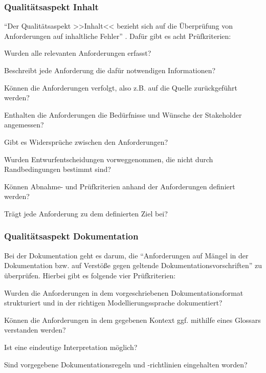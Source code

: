 \documentclass [12pt, a4paper, oneside, titlepage, ngerman]{article}
\begin{document}
\subsubsection{Qualitätsaspekt Inhalt}
"`Der Qualitätsaspekt >>Inhalt<< bezieht sich auf die Überprüfung von Anforderungen auf inhaltliche Fehler"' \cite[S.98]{PohlRupp2015}. Dafür gibt es acht Prüfkriterien\cite[vgl.][S.98]{PohlRupp2015}: 
\begin{description}[font=\itshape]\setlength\itemsep{0em}
\item[Vollständigkeit:] Wurden alle relevanten Anforderungen erfasst?
\item[Korrektheit:] Beschreibt jede Anforderung die dafür notwendigen Informationen?
\item[Verfolgbarkeit:] Können die Anforderungen verfolgt, also z.B. auf die Quelle zurückgeführt werden?
\item[Adäquatheit:] Enthalten die Anforderungen die Bedürfnisse und Wünsche der Stakeholder angemessen?
\item[Konsistenz:] Gibt es Widersprüche zwischen den Anforderungen?
\item[Vorzeitige Entwurfsentscheidungen:] Wurden Entwurfentscheidungen vorweggenommen, die nicht durch Randbedingungen bestimmt sind?
\item[Überprüfbarkeit:] Können Abnahme- und Prüfkriterien anhand der Anforderungen definiert werden?
\item[Notwendigkeit:] Trägt jede Anforderung zu dem definierten Ziel bei?
\end{description}

\subsubsection{Qualitätsaspekt Dokumentation}
Bei der Dokumentation geht es darum, die "`Anforderungen auf Mängel in der Dokumentation bzw. auf Verstöße gegen geltende Dokumentationsvorschriften"'\cite[S.99]{PohlRupp2015} zu überprüfen. Hierbei gibt es folgende vier Prüfkriterien\cite[vlg. S.99f.]{PohlRupp2015}:
\begin{description}[font=\itshape]\setlength\itemsep{0em}
\item[Konformität:] Wurden die Anforderungen in dem vorgeschriebenen Dokumentationsformat strukturiert und in der richtigen Modellierungssprache dokumentiert?
\item[Verständlichkeit:] Können die Anforderungen in dem gegebenen Kontext ggf. mithilfe eines Glossars verstanden werden?
\item[Eindeutigkeit:] Ist eine eindeutige Interpretation möglich?
\item[Konfirmität mit Dokumentationsregeln:] Sind vorgegebene Dokumentationsregeln und -richtlinien eingehalten worden?
\end{description}
\end{document}
